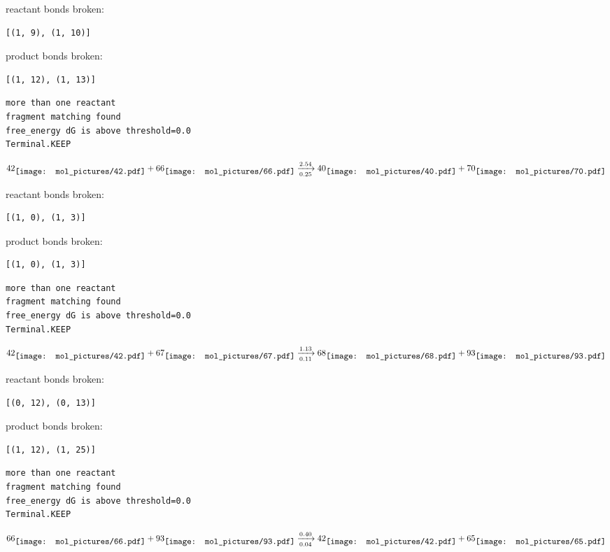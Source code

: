 \documentclass{article}
\begin{document}
reactant bonds broken:\begin{verbatim}
[(1, 9), (1, 10)]
\end{verbatim}
product bonds broken:\begin{verbatim}
[(1, 12), (1, 13)]
\end{verbatim}




\vspace{1cm}
\begin{verbatim}
more than one reactant
fragment matching found
free_energy dG is above threshold=0.0
Terminal.KEEP
\end{verbatim}
$$
42
\raisebox{-.5\height}{\texttt{[image: mol\_pictures/42.pdf]}}
+
66
\raisebox{-.5\height}{\texttt{[image: mol\_pictures/66.pdf]}}
\xrightarrow[0.25]{2.54}
40
\raisebox{-.5\height}{\texttt{[image: mol\_pictures/40.pdf]}}
+
70
\raisebox{-.5\height}{\texttt{[image: mol\_pictures/70.pdf]}}
$$


reactant bonds broken:\begin{verbatim}
[(1, 0), (1, 3)]
\end{verbatim}
product bonds broken:\begin{verbatim}
[(1, 0), (1, 3)]
\end{verbatim}




\vspace{1cm}
\begin{verbatim}
more than one reactant
fragment matching found
free_energy dG is above threshold=0.0
Terminal.KEEP
\end{verbatim}
$$
42
\raisebox{-.5\height}{\texttt{[image: mol\_pictures/42.pdf]}}
+
67
\raisebox{-.5\height}{\texttt{[image: mol\_pictures/67.pdf]}}
\xrightarrow[0.11]{1.13}
68
\raisebox{-.5\height}{\texttt{[image: mol\_pictures/68.pdf]}}
+
93
\raisebox{-.5\height}{\texttt{[image: mol\_pictures/93.pdf]}}
$$


reactant bonds broken:\begin{verbatim}
[(0, 12), (0, 13)]
\end{verbatim}
product bonds broken:\begin{verbatim}
[(1, 12), (1, 25)]
\end{verbatim}




\vspace{1cm}
\begin{verbatim}
more than one reactant
fragment matching found
free_energy dG is above threshold=0.0
Terminal.KEEP
\end{verbatim}
$$
66
\raisebox{-.5\height}{\texttt{[image: mol\_pictures/66.pdf]}}
+
93
\raisebox{-.5\height}{\texttt{[image: mol\_pictures/93.pdf]}}
\xrightarrow[0.04]{0.40}
42
\raisebox{-.5\height}{\texttt{[image: mol\_pictures/42.pdf]}}
+
65
\raisebox{-.5\height}{\texttt{[image: mol\_pictures/65.pdf]}}
$$
\end{document}
